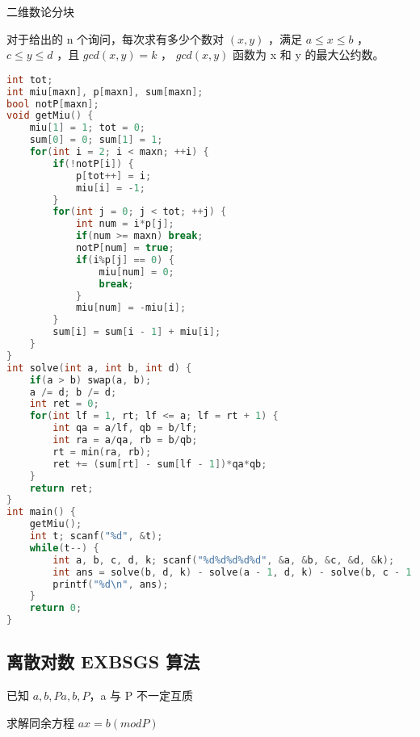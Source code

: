 二维数论分块

对于给出的 n 个询问，每次求有多少个数对 $(x, y)$ ，满足 $a \le x \le b$ ， $c \le y \le d$ ，且 $gcd(x, y) = k$ ， $gcd(x, y)$ 函数为 x 和 y 的最大公约数。

\begin{lstlisting}[language=C++]
int tot;
int miu[maxn], p[maxn], sum[maxn];
bool notP[maxn];
void getMiu() {
    miu[1] = 1; tot = 0;
    sum[0] = 0; sum[1] = 1;
    for(int i = 2; i < maxn; ++i) {
        if(!notP[i]) {
            p[tot++] = i;
            miu[i] = -1;
        }
        for(int j = 0; j < tot; ++j) {
            int num = i*p[j];
            if(num >= maxn) break;
            notP[num] = true;
            if(i%p[j] == 0) {
                miu[num] = 0;
                break;
            }
            miu[num] = -miu[i];
        }
        sum[i] = sum[i - 1] + miu[i];
    }
}
int solve(int a, int b, int d) {
    if(a > b) swap(a, b);
    a /= d; b /= d;
    int ret = 0;
    for(int lf = 1, rt; lf <= a; lf = rt + 1) {
        int qa = a/lf, qb = b/lf;
        int ra = a/qa, rb = b/qb;
        rt = min(ra, rb);
        ret += (sum[rt] - sum[lf - 1])*qa*qb;
    }
    return ret;
}
int main() {
    getMiu();
    int t; scanf("%d", &t);
    while(t--) {
        int a, b, c, d, k; scanf("%d%d%d%d%d", &a, &b, &c, &d, &k);
        int ans = solve(b, d, k) - solve(a - 1, d, k) - solve(b, c - 1, k) + solve(a - 1, c - 1, k);
        printf("%d\n", ans);
    }
    return 0;
}
\end{lstlisting}

\subsection{离散对数 EXBSGS 算法}

已知 $a, b, Pa, b, P$，a 与 P 不一定互质

求解同余方程 $ax = b (mod P)$

